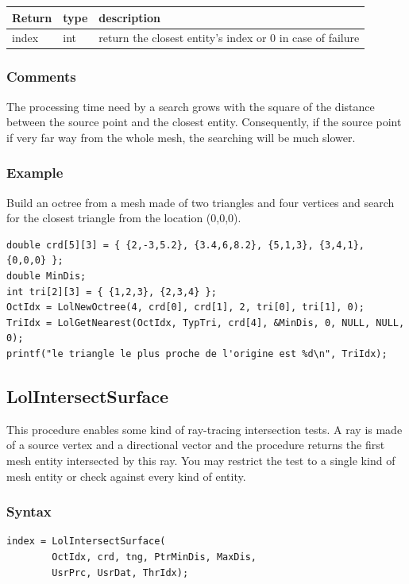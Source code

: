 \documentclass[a4paper,12pt]{article}
\begin{document}
\medskip

\begin{tabular}{|m{3cm}|m{2cm}|m{8.5cm}|}
\hline
Return     & type   & description \\
\hline
index      & int    & return the closest entity's index or 0 in case of failure \\
\hline
\end{tabular}
\subsubsection*{Comments}
The processing time need by a search grows with the square of the distance between the source point and the closest entity. Consequently, if the source point if very far way from the whole mesh, the searching will be much slower.

\subsubsection*{Example}
Build an octree from a mesh made of two triangles and four vertices and search for the closest triangle from the location (0,0,0).

\begin{tt}
\begin{verbatim}
double crd[5][3] = { {2,-3,5.2}, {3.4,6,8.2}, {5,1,3}, {3,4,1}, {0,0,0} };
double MinDis;
int tri[2][3] = { {1,2,3}, {2,3,4} };
OctIdx = LolNewOctree(4, crd[0], crd[1], 2, tri[0], tri[1], 0);
TriIdx = LolGetNearest(OctIdx, TypTri, crd[4], &MinDis, 0, NULL, NULL, 0);
printf("le triangle le plus proche de l'origine est %d\n", TriIdx);
\end{verbatim}
\end{tt}
\normalfont


\subsection{LolIntersectSurface}
This procedure enables some kind of ray-tracing intersection tests. A ray is made of a source vertex and a directional vector and the procedure returns the first mesh entity intersected by this ray. You may restrict the test to a single kind of mesh entity or check against every kind of entity.

\subsubsection*{Syntax}
\begin{tt}
\begin{verbatim}
index = LolIntersectSurface(
        OctIdx, crd, tng, PtrMinDis, MaxDis,
        UsrPrc, UsrDat, ThrIdx);
\end{verbatim}
\end{tt}
\normalfont
\end{document}
